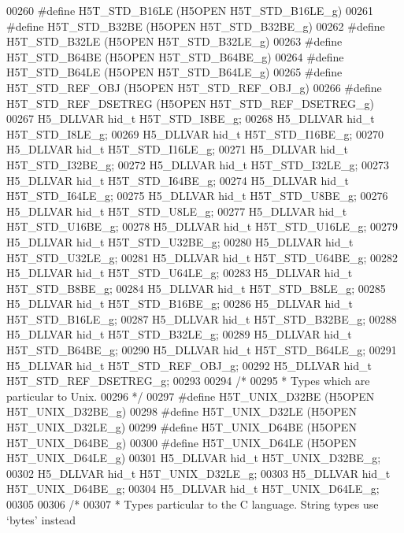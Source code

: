 \begin{DoxyCode}
00260 \textcolor{preprocessor}{#define H5T\_STD\_B16LE       (H5OPEN H5T\_STD\_B16LE\_g)}
00261 \textcolor{preprocessor}{#define H5T\_STD\_B32BE       (H5OPEN H5T\_STD\_B32BE\_g)}
00262 \textcolor{preprocessor}{#define H5T\_STD\_B32LE       (H5OPEN H5T\_STD\_B32LE\_g)}
00263 \textcolor{preprocessor}{#define H5T\_STD\_B64BE       (H5OPEN H5T\_STD\_B64BE\_g)}
00264 \textcolor{preprocessor}{#define H5T\_STD\_B64LE       (H5OPEN H5T\_STD\_B64LE\_g)}
00265 \textcolor{preprocessor}{#define H5T\_STD\_REF\_OBJ         (H5OPEN H5T\_STD\_REF\_OBJ\_g)}
00266 \textcolor{preprocessor}{#define H5T\_STD\_REF\_DSETREG     (H5OPEN H5T\_STD\_REF\_DSETREG\_g)}
00267 H5\_DLLVAR hid\_t H5T\_STD\_I8BE\_g;
00268 H5\_DLLVAR hid\_t H5T\_STD\_I8LE\_g;
00269 H5\_DLLVAR hid\_t H5T\_STD\_I16BE\_g;
00270 H5\_DLLVAR hid\_t H5T\_STD\_I16LE\_g;
00271 H5\_DLLVAR hid\_t H5T\_STD\_I32BE\_g;
00272 H5\_DLLVAR hid\_t H5T\_STD\_I32LE\_g;
00273 H5\_DLLVAR hid\_t H5T\_STD\_I64BE\_g;
00274 H5\_DLLVAR hid\_t H5T\_STD\_I64LE\_g;
00275 H5\_DLLVAR hid\_t H5T\_STD\_U8BE\_g;
00276 H5\_DLLVAR hid\_t H5T\_STD\_U8LE\_g;
00277 H5\_DLLVAR hid\_t H5T\_STD\_U16BE\_g;
00278 H5\_DLLVAR hid\_t H5T\_STD\_U16LE\_g;
00279 H5\_DLLVAR hid\_t H5T\_STD\_U32BE\_g;
00280 H5\_DLLVAR hid\_t H5T\_STD\_U32LE\_g;
00281 H5\_DLLVAR hid\_t H5T\_STD\_U64BE\_g;
00282 H5\_DLLVAR hid\_t H5T\_STD\_U64LE\_g;
00283 H5\_DLLVAR hid\_t H5T\_STD\_B8BE\_g;
00284 H5\_DLLVAR hid\_t H5T\_STD\_B8LE\_g;
00285 H5\_DLLVAR hid\_t H5T\_STD\_B16BE\_g;
00286 H5\_DLLVAR hid\_t H5T\_STD\_B16LE\_g;
00287 H5\_DLLVAR hid\_t H5T\_STD\_B32BE\_g;
00288 H5\_DLLVAR hid\_t H5T\_STD\_B32LE\_g;
00289 H5\_DLLVAR hid\_t H5T\_STD\_B64BE\_g;
00290 H5\_DLLVAR hid\_t H5T\_STD\_B64LE\_g;
00291 H5\_DLLVAR hid\_t H5T\_STD\_REF\_OBJ\_g;
00292 H5\_DLLVAR hid\_t H5T\_STD\_REF\_DSETREG\_g;
00293 
00294 \textcolor{comment}{/*}
00295 \textcolor{comment}{ * Types which are particular to Unix.}
00296 \textcolor{comment}{ */}
00297 \textcolor{preprocessor}{#define H5T\_UNIX\_D32BE      (H5OPEN H5T\_UNIX\_D32BE\_g)}
00298 \textcolor{preprocessor}{#define H5T\_UNIX\_D32LE      (H5OPEN H5T\_UNIX\_D32LE\_g)}
00299 \textcolor{preprocessor}{#define H5T\_UNIX\_D64BE      (H5OPEN H5T\_UNIX\_D64BE\_g)}
00300 \textcolor{preprocessor}{#define H5T\_UNIX\_D64LE      (H5OPEN H5T\_UNIX\_D64LE\_g)}
00301 H5\_DLLVAR hid\_t H5T\_UNIX\_D32BE\_g;
00302 H5\_DLLVAR hid\_t H5T\_UNIX\_D32LE\_g;
00303 H5\_DLLVAR hid\_t H5T\_UNIX\_D64BE\_g;
00304 H5\_DLLVAR hid\_t H5T\_UNIX\_D64LE\_g;
00305 
00306 \textcolor{comment}{/*}
00307 \textcolor{comment}{ * Types particular to the C language.  String types use `bytes' instead}

\end{DoxyCode}
